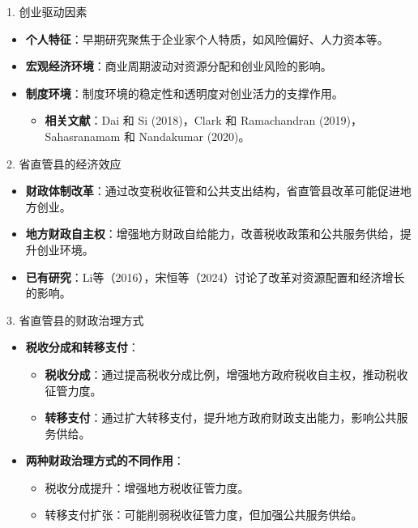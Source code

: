 \documentclass{beamer}
\newcommand{\tightlist}{%
  \setlength{\itemsep}{0pt}\setlength{\parskip}{0pt}}
\begin{document}
\begin{frame}{1. 创业驱动因素}
\label{ux521bux4e1aux9a71ux52a8ux56e0ux7d20}
\begin{itemize}
\tightlist
\item
  \textbf{个人特征}：早期研究聚焦于企业家个人特质，如风险偏好、人力资本等。
\item
  \textbf{宏观经济环境}：商业周期波动对资源分配和创业风险的影响。
\item
  \textbf{制度环境}：制度环境的稳定性和透明度对创业活力的支撑作用。

  \begin{itemize}
  \tightlist
  \item
    \textbf{相关文献}：Dai 和 Si (2018)，Clark 和 Ramachandran
    (2019)，Sahasranamam 和 Nandakumar (2020)。
  \end{itemize}
\end{itemize}
\end{frame}

\begin{frame}{2. 省直管县的经济效应}
\label{ux7701ux76f4ux7ba1ux53bfux7684ux7ecfux6d4eux6548ux5e94}
\begin{itemize}
\tightlist
\item
  \textbf{财政体制改革}：通过改变税收征管和公共支出结构，省直管县改革可能促进地方创业。
\item
  \textbf{地方财政自主权}：增强地方财政自给能力，改善税收政策和公共服务供给，提升创业环境。
\item
  \textbf{已有研究}：Li等（2016），宋恒等（2024）讨论了改革对资源配置和经济增长的影响。
\end{itemize}
\end{frame}

\begin{frame}{3. 省直管县的财政治理方式}
\label{ux7701ux76f4ux7ba1ux53bfux7684ux8d22ux653fux6cbbux7406ux65b9ux5f0f}
\begin{itemize}
\tightlist
\item
  \textbf{税收分成和转移支付}：

  \begin{itemize}
  \tightlist
  \item
    \textbf{税收分成}：通过提高税收分成比例，增强地方政府税收自主权，推动税收征管力度。
  \item
    \textbf{转移支付}：通过扩大转移支付，提升地方政府财政支出能力，影响公共服务供给。
  \end{itemize}
\item
  \textbf{两种财政治理方式的不同作用}：

  \begin{itemize}
  \tightlist
  \item
    税收分成提升：增强地方税收征管力度。
  \item
    转移支付扩张：可能削弱税收征管力度，但加强公共服务供给。
  \end{itemize}
\end{itemize}
\end{frame}
\end{document}
